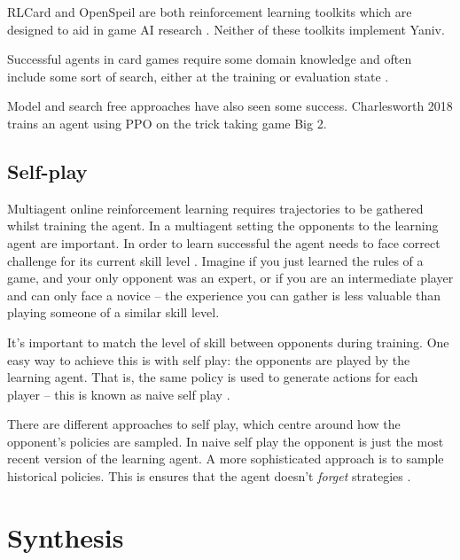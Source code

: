 \documentclass[../main.tex]{subfiles}
\begin{document}
RLCard and OpenSpeil are both reinforcement learning toolkits which are designed to aid in game AI research \cite{zha_rlcard_2020, lanctot_openspiel_2020}. Neither of these toolkits implement Yaniv. 

Successful agents in card games require some domain knowledge and often include some sort of search, either at the training or evaluation state \cite{shi_scrofazero_2021,brown_combining_2020,brown_superhuman_2018}. 

Model and search free approaches have also seen some success. Charlesworth 2018 \cite{charlesworth_application_2018} trains an agent using PPO on the trick taking game Big 2. 

\subsection{Self-play} \label{litrev:self-play}
Multiagent online reinforcement learning requires trajectories to be gathered whilst training the agent. In a multiagent setting the opponents to the learning agent are important. In order to learn successful the agent needs to face correct challenge for its current skill level \cite{hernandez_comparison_2020,heinrich_deep_2016}. Imagine if you just learned the rules of a game, and your only opponent was an expert, or if you are an intermediate player and can only face a novice -- the experience you can gather is less valuable than playing someone of a similar skill level. 

It's important to match the level of skill between opponents during training. One easy way to achieve this is with self play: the opponents are played by the learning agent. That is, the same policy is used to generate actions for each player -- this is known as naive self play \cite{hernandez_comparison_2020}. 

There are different approaches to self play, which centre around how the opponent's policies are sampled. In naive self play the opponent is just the most recent version of the learning agent. A more sophisticated approach is to sample historical policies. This is ensures that the agent doesn't \textit{forget} strategies \cite{bansal_emergent_2018}.

\section{Synthesis}
\end{document}
